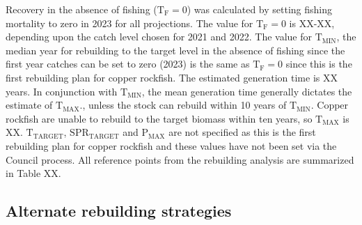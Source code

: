 \documentclass[11pt,
  english,
  a4paper,
]{article}
\begin{document}
Recovery in the absence of fishing ({\(\text{T}_\text{F}=0\)\leavevmode\tagmcend\tagstructend}) was calculated by setting fishing mortality to zero in 2023 for all projections. The value for {\(\text{T}_\text{F}=0\)\leavevmode\tagmcend\tagstructend} is XX-XX, depending upon the catch level chosen for 2021 and 2022. The value for {\(\text{T}_\text{MIN}\)\leavevmode\tagmcend\tagstructend}, the median year for rebuilding to the target level in the absence of fishing since the first year catches can be set to zero (2023) is the same as {\(\text{T}_\text{F}=0\)\leavevmode\tagmcend\tagstructend} since this is the first rebuilding plan for copper rockfish. The estimated generation time is XX years. In conjunction with {\(\text{T}_\text{MIN}\)\leavevmode\tagmcend\tagstructend}, the mean generation time generally dictates the estimate of {\(\text{T}_\text{MAX}\)\leavevmode\tagmcend\tagstructend}., unless the stock can rebuild within 10 years of {\(\text{T}_\text{MIN}\)\leavevmode\tagmcend\tagstructend}. Copper rockfish are unable to rebuild to the target biomass within ten years, so {\(\text{T}_\text{MAX}\)\leavevmode\tagmcend\tagstructend} is XX. {\(\text{T}_\text{TARGET}\)\leavevmode\tagmcend\tagstructend}, {\(\text{SPR}_\text{TARGET}\)\leavevmode\tagmcend\tagstructend} and {\(\text{P}_\text{MAX}\)\leavevmode\tagmcend\tagstructend} are not specified as this is the first rebuilding plan for copper rockfish and these values have not been set via the Council process. All reference points from the rebuilding analysis are summarized in Table XX.

\leavevmode\tagmcend\tagstructend\par


\hypertarget{alternate-rebuilding-strategies}{%
\subsection{Alternate rebuilding strategies}\label{alternate-rebuilding-strategies}}
\end{document}
